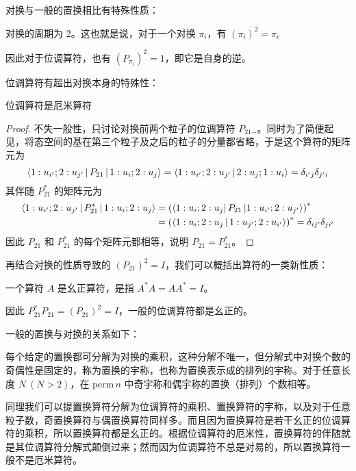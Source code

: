 \documentclass[cn,10pt,math=newtx,citestyle=gb7714-2015,bibstyle=gb7714-2015]{elegantbook}
\begin{document}
对换与一般的置换相比有特殊性质：
\begin{lemma}[对换的性质]
    对换的周期为 2。这也就是说，对于一个对换 $\pi_i$，有 $(\pi_i)^2 =\pi_e$
\end{lemma}
因此对于位调算符，也有 $\left(P_{\pi_i}\right)^2=1$，即它是自身的逆。

位调算符有超出对换本身的特殊性：
\begin{lemma}[位调算符的性质]
    位调算符是厄米算符
\end{lemma}
\begin{proof}
    不失一般性，只讨论对换前两个粒子的位调算符 $P_{21\cdots}$。同时为了简便起见，将态空间的基在第三个粒子及之后的粒子的分量都省略，于是这个算符的矩阵元为
    \begin{equation}
        \Braket{1:u_{i'};2:u_{j'}|P_{21}|1:u_i;2:u_j} = \Braket{1:u_{i'};2:u_{j'}|2:u_j;1:u_i} = \delta_{i'j}\delta_{j'i}
    \end{equation}
    其伴随 $P_{21}^*$ 的矩阵元为
    \begin{align}
        \Braket{1:u_{i'};2:u_{j'}|P_{21}^*|1:u_i;2:u_j} &=\left(\bra{1:u_i;2:u_j}P_{21}\ket{1:u_{i'};2:u_{j'}}\right)^*\nonumber\\
        & =\left(\Braket{1:u_i;2:u_j|1:u_{j'};2:u_{i'}}\right)^* = \delta_{ij'}\delta_{ji'}
    \end{align}
    因此 $P_{21}$ 和 $P_{21}^*$ 的每个矩阵元都相等，说明 $P_{21} = P_{21}^*$。
\end{proof}

再结合对换的性质导致的 $(P_{21})^2 = I$，我们可以概括出算符的一类新性质：
\begin{definition}[幺正算符]
    一个算符 $A$ 是幺正算符，是指 $A^*A = AA^* = I$。
\end{definition}
因此 $P_{21}^*P_{21} = (P_{21})^2 = I$，一般的位调算符都是幺正的。

一般的置换与对换的关系如下：
\begin{theorem}[置换的对换分解]
   每个给定的置换都可分解为对换的乘积，这种分解不唯一，但分解式中对换个数的奇偶性是固定的，称为置换的宇称，也称为置换表示成的排列的宇称。对于任意长度 $N\ (N>2)$，在 $\text{perm}\,n$ 中奇宇称和偶宇称的置换（排列）个数相等。
\end{theorem}
同理我们可以提置换算符分解为位调算符的乘积、置换算符的宇称，以及对于任意粒子数，奇置换算符与偶置换算符同样多。而且因为置换算符是若干幺正的位调算符的乘积，所以置换算符都是幺正的。根据位调算符的厄米性，置换算符的伴随就是其位调算符分解式颠倒过来；然而因为位调算符不总是对易的，所以置换算符一般不是厄米算符。
\end{document}
